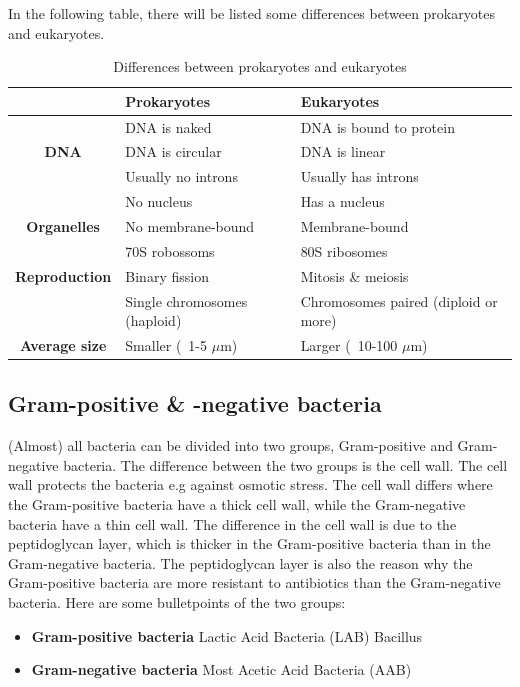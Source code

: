 In the following table, there will be listed some differences between prokaryotes and eukaryotes.

\begin{table}[h]
    \centering
    \caption{Differences between prokaryotes and eukaryotes}
    \label{tab:DiffProkEuk}
    \begin{tabular}{c|l|l}
        & \textbf{Prokaryotes} & \textbf{Eukaryotes} \\
        \hline
         & 
        DNA is naked & DNA is bound to protein \\
        \textbf{DNA} & DNA is circular & DNA is linear \\
        & Usually no introns & Usually has introns \\
        \hline
        & No nucleus & Has a nucleus \\
        \textbf{Organelles} & No membrane-bound & Membrane-bound \\
        & 70S robossoms & 80S ribosomes \\
        \hline
        \textbf{Reproduction} & Binary fission & Mitosis \& meiosis \\
        & Single chromosomes (haploid) & Chromosomes paired (diploid or more)\\
        \hline
        \textbf{Average size} & Smaller (~1-5 $\mu$m) & Larger (~10-100 $\mu$m) \\
    \end{tabular}
\end{table}

\subsection{Gram-positive \& -negative bacteria}
(Almost) all bacteria can be divided into two groups, Gram-positive and Gram-negative bacteria. The difference between the two groups is the cell wall. The cell wall protects the bacteria e.g against osmotic stress. The cell wall differs where the Gram-positive bacteria have a thick cell wall, while the Gram-negative bacteria have a thin cell wall. The difference in the cell wall is due to the peptidoglycan layer, which is thicker in the Gram-positive bacteria than in the Gram-negative bacteria. The peptidoglycan layer is also the reason why the Gram-positive bacteria are more resistant to antibiotics than the Gram-negative bacteria. Here are some bulletpoints of the two groups:

\begin{highlight}
    \begin{itemize}
        \item \textbf{Gram-positive bacteria} 
        \subitem Lactic Acid Bacteria (LAB)
        \subitem Bacillus
        \item \textbf{Gram-negative bacteria}
        \subitem Most Acetic Acid Bacteria (AAB)    
    \end{itemize}
\end{highlight}

